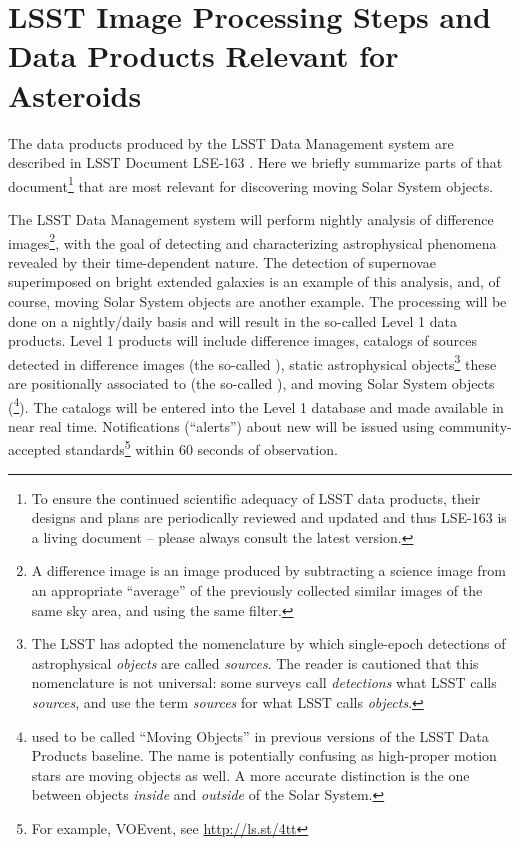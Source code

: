 \section{LSST Image Processing Steps and Data Products Relevant for Asteroids} \label{sec:AppA}

The data products produced by the LSST Data Management system are described in
LSST Document LSE-163 \citep[LSST Data Products
Definition Document,][]{LSE-163}. Here we briefly summarize parts of that
document\footnote{To ensure the continued scientific adequacy of LSST data
products, their designs and plans are periodically reviewed and updated and
thus LSE-163 is a living document -- please always consult the latest version.}
that are most relevant for discovering moving Solar System objects.

The LSST Data Management system will perform nightly analysis of difference images\footnote{A difference
image is an image produced by subtracting a science image from an appropriate
``average'' of the previously collected similar images of the same sky area, and using the
same filter.}, with the goal of detecting and characterizing astrophysical phenomena
revealed by their time-dependent nature. The detection of supernovae superimposed
on bright extended galaxies is an example of this analysis, and, of course, moving Solar
System objects are another example. The processing will be done on a nightly/daily
basis and will result in the so-called Level 1 data products. Level 1 products will include
difference images, catalogs of sources detected in difference images (the so-called
\DIASources), static astrophysical objects\footnote{The LSST has adopted the nomenclature by
which single-epoch detections of astrophysical {\em objects} are called {\em sources}.
The reader is cautioned that this nomenclature is not universal: some surveys call
{\em detections} what LSST calls {\em sources}, and use the term {\em sources} for what
LSST calls {\em objects}.} these \DIASources are positionally associated to (the so-called \DIAObjects),
and moving Solar System objects (\SSObjects\footnote{\SSObjects used to be called
``Moving Objects'' in previous versions of the LSST Data Products baseline. The name is
potentially confusing as high-proper motion stars are moving objects as well. A more
accurate distinction is the one between objects {\em inside} and {\em outside} of the Solar
System.}). The catalogs will be entered into the Level 1 database and made available in near
real time. Notifications (``alerts'') about new \DIASources will be issued using
community-accepted standards\footnote{For example, VOEvent, see \url{http://ls.st/4tt}} within
60 seconds of observation.

